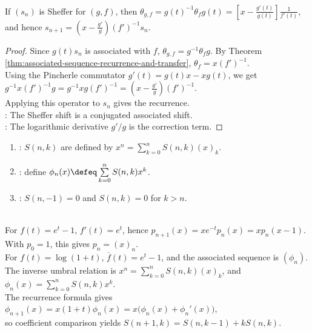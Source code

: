 \begin{corollary} \label{cor:sheffer-shift-formula} \\
If $(s_n)$ is Sheffer for $(g,f)$, then $\theta_{g,f}=g(t)^{-1}\theta_fg(t) =\left[x-\frac{g'(t)}{g(t)}\right]\frac{1}{f'(t)}$, and hence $s_{n+1}=\left(x-\frac{g'}{g}\right)(f')^{-1}s_n$.
\begin{proof}
Since $g(t)s_n$ is associated with $f$, $\theta_{g,f}=g^{-1}\theta_fg$. By Theorem \ref{thm:associated-sequence-recurrence-and-transfer}, $\theta_f=x(f')^{-1}$.\\
Using the Pincherle commutator $g'(t)=g(t)x-xg(t)$, we get $g^{-1}x(f')^{-1}g =g^{-1}xg(f')^{-1} =\left(x-\frac{g'}{g}\right)(f')^{-1}$.\\
Applying this operator to $s_n$ gives the recurrence.\\
: The Sheffer shift is a conjugated associated
shift.\\
: The logarithmic derivative $g'/g$ is the correction term.
\end{proof}
\end{corollary}

\begin{definition} \label{def:stirling-and-exponential-polynomials} 
\begin{enumerate}[label=(\roman*)]
\setlength{\itemsep}{0pt}
\item {}: $S(n,k)$ are defined by $x^n=\sum\limits_{k=0}^{n}S(n,k)(x)_k$.
\item {}: define $\phi_n(x)\defeq\sum\limits_{k=0}^{n}S(n,k)x^k$.
\item {}: $S(n,-1)=0$ and $S(n,k)=0$ for $k>n$.
\end{enumerate}
\end{definition}

\begin{example} \label{ex:umbral-recurrences-stirling} \\
For $f(t)=e^t-1$, $f'(t)=e^t$, hence $p_{n+1}(x)=xe^{-t}p_n(x)=xp_n(x-1)$. With $p_0=1$, this gives $p_n=(x)_n$.\\
For $f(t)=\log(1+t)$, $\overline f(t)=e^t-1$, and the associated sequence is $(\phi_n)$.\\
The inverse umbral relation is $x^n=\sum\limits_{k=0}^{n}S(n,k)(x)_k$, and $\phi_n(x)=\sum\limits_{k=0}^{n}S(n,k)x^k$.\\
The recurrence formula gives $\phi_{n+1}(x)=x(1+t)\phi_n(x)=x\bigl(\phi_n(x)+\phi_n'(x)\bigr)$,\\
so coefficient comparison yields $S(n+1,k)=S(n,k-1)+kS(n,k)$.
\end{example}

